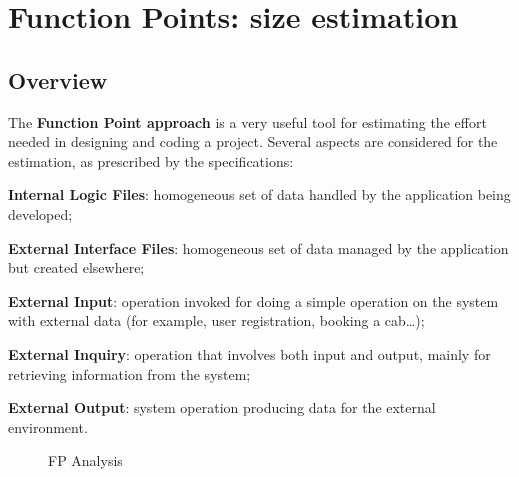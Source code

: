 \section{Function Points: size estimation}
\subsection{Overview} %
\label{sub:fp_overview}

The \textbf{Function Point approach} is a very useful tool for estimating the effort needed in designing and coding a project. Several aspects are considered for the estimation, as prescribed by the specifications: 
\begin{description}
    \item \textbf{Internal Logic Files}: homogeneous set of data handled by the application being developed;
    \item \textbf{External Interface Files}: homogeneous set of data managed by the application but created elsewhere;
    \item \textbf{External Input}: operation invoked for doing a simple operation on the system with external data (for example, user registration, booking a cab\ldots);
    \item \textbf{External Inquiry}: operation that involves both input and output, mainly for retrieving information from the system;
    \item \textbf{External Output}: system operation producing data for the external environment.
\end{description}

\begin{figure}
\centering
{}
\caption{FP Analysis}
\end{figure}

